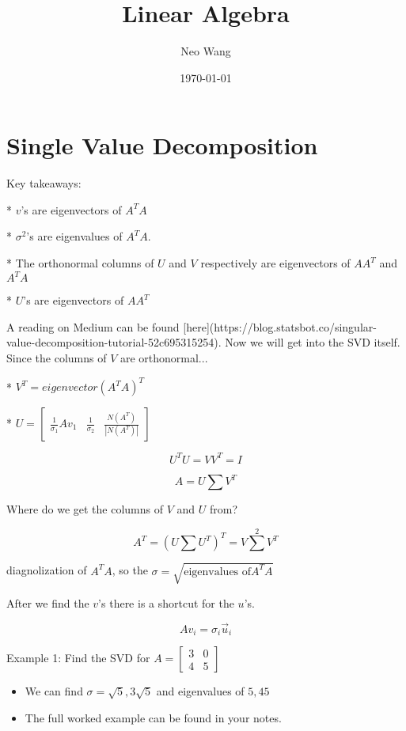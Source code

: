 \documentclass{article}
\title{Linear Algebra}
\author{Neo Wang}
\date{\today}
\begin{document}
\maketitle
\tableofcontents


\section{Single Value Decomposition}

\begin{markdown}

Key takeaways:

* $v$'s are eigenvectors of $A^TA$

* $\sigma^2$'s are eigenvalues of $A^TA$.

* The orthonormal columns of $U$ and $V$ respectively are eigenvectors of $AA^T$ and $A^TA$

* $U$'s are eigenvectors of $AA^T$

A reading on Medium can be found [here](https://blog.statsbot.co/singular-value-decomposition-tutorial-52c695315254). Now we will get into the SVD itself. Since the columns of $V$ are orthonormal...

* $V^T = eigenvector(A^TA)^T$

* $U = \begin{bmatrix}\frac{1}{\sigma_1}Av_1 & \frac{1}{\sigma_2} & \frac{N(A^T)}{|N(A^T)|}\end{bmatrix}$

$$U^TU=VV^T=I$$

$$A = U\sum V^T$$

Where do we get the columns of $V$ and $U$ from?

$$A^T = (U\sum U^T)^T=V\sum^2 V^T$$

diagnolization of $A^TA$, so the $\sigma=\sqrt{\text{eigenvalues of}A^TA}$

\end{markdown}

After we find the $v$'s there is a shortcut for the $u$'s.

$$Av_i=\sigma_i\vec{u}_i$$

Example 1: Find the SVD for $A = \begin{bmatrix}
	3 & 0 \\4&5
\end{bmatrix}$

\begin{itemize}
	\item We can find $\sigma = \sqrt{5}, 3\sqrt{5}$ and eigenvalues of $5, 45$
	\item The full worked example can be found in your notes.
\end{itemize}
\end{document}

